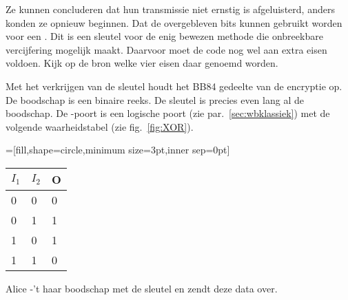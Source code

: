 \documentclass[../../main.tex]{subfiles}
\begin{document}
Ze kunnen concluderen dat hun transmissie niet ernstig is afgeluisterd, anders konden ze opnieuw beginnen. Dat de overgebleven bits kunnen gebruikt  worden voor een . Dit is een sleutel voor de enig bewezen methode die onbreekbare vercijfering mogelijk maakt. Daarvoor moet de code nog wel aan extra eisen voldoen. Kijk op de bron welke vier eisen daar genoemd worden. 

Met het verkrijgen van de sleutel houdt het BB84 gedeelte van de encryptie op. De boodschap is een binaire reeks. De sleutel is precies even lang al de boodschap.
De -poort is een logische poort (zie par.~\ref{sec:wbklassiek}) met de volgende waarheidstabel (zie fig.~\ref{fig:XOR}).

\begin{center}
\begin{minipage}[b]{.22\textwidth}
\begin{center}
=[fill,shape=circle,minimum size=3pt,inner sep=0pt]
\end{center}
\end{minipage}%
\hspace{0.25cm}
\begin{minipage}[b]{.22\textwidth}
{\scriptsize
\begin{tabular}{|l|l|l|}
\hline
$I_1$ & $I_2$ & O \\\hline
0    & 0  & 0 \\\hline
0    & 1  & 1 \\\hline
1    & 0  & 1 \\\hline
1    & 1  & 0 \\ \hline
\end{tabular}
}
\end{minipage}
\end{center}

Alice -'t haar boodschap met de sleutel en zendt deze data over. 
\end{document}
